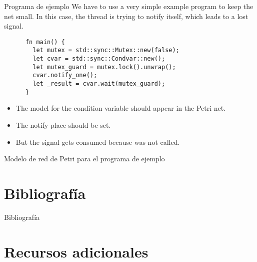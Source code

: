 \documentclass{beamer}
\begin{document}
\begin{frame}[fragile]{Programa de ejemplo}
  We have to use a very simple example program to keep the net small.
  In this case, the thread is trying to notify itself, which leads to a lost signal.

  \begin{listing}
    \begin{verbatim}
      fn main() {
        let mutex = std::sync::Mutex::new(false);
        let cvar = std::sync::Condvar::new();
        let mutex_guard = mutex.lock().unwrap();
        cvar.notify_one();
        let _result = cvar.wait(mutex_guard);
      }     
    \end{verbatim}
  \end{listing}

  \begin{itemize}
    \item The model for the condition variable should appear in the Petri net.
    \item The notify place should be set.
    \item But the signal gets consumed because  was not called.
  \end{itemize}
\end{frame}

\begin{frame}{Modelo de red de Petri para el programa de ejemplo}
  \begin{figure}
    \centering
    
  \end{figure}
\end{frame}

\section{Bibliografía}

\begin{frame}[allowframebreaks]{Bibliografía}
  \tiny
  
  
\end{frame}

\section{Recursos adicionales}
\end{document}
